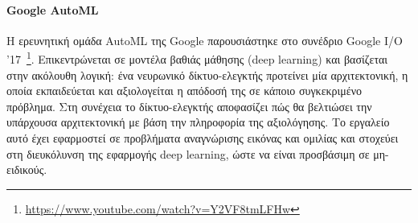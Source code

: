  \paragraph{Google AutoML} Η ερευνητική ομάδα AutoML της Google παρουσιάστηκε στο συνέδριο Goo\-gle I/O '17~\footnote{\url{https://www.youtube.com/watch?v=Y2VF8tmLFHw}}. Επικεντρώνεται σε μοντέλα βαθιάς μάθησης (deep learning) και βασίζεται στην ακόλουθη λογική: ένα νευρωνικό δίκτυο-ελεγκτής προτείνει μία αρχιτεκτονική, η οποία εκπαιδεύεται και αξιολογείται η απόδοσή της σε κάποιο συγκεκριμένο πρόβλημα. Στη συνέχεια το δίκτυο-ελεγκτής αποφασίζει πώς θα βελτιώσει την υπάρχουσα αρχιτεκτονική με βάση την πληροφορία της αξιολόγησης. Το εργαλείο αυτό έχει εφαρμοστεί σε προβλήματα αναγνώρισης εικόνας και ομιλίας και στοχεύει στη διευκόλυνση της εφαρμογής deep learning, ώστε να είναι προσβάσιμη σε μη-ειδικούς.
 